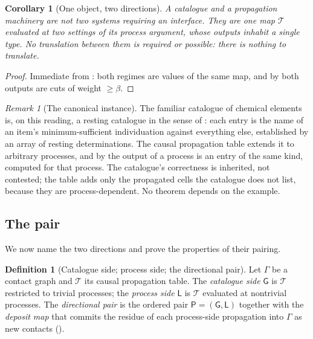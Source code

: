 \documentclass[11pt,twocolumn,a4paper]{article}
\theoremstyle{dirthm}
\newtheorem{corollary}[theorem]{Corollary}
\theoremstyle{definition}
\newtheorem{definition}[theorem]{Definition}
\theoremstyle{remark}
\newtheorem{remark}[theorem]{Remark}
\newcommand{\Gph}{\Gamma}
\newcommand{\flo}{\beta}
\newcommand{\Tab}{\mathcal{T}}
\newcommand{\Model}{\mathsf{L}}
\newcommand{\Graph}{\mathsf{G}}
\newcommand{\Pair}{\mathsf{P}}
\begin{document}
\begin{corollary}[One object, two directions]
\label{cor:one-object}
A catalogue and a propagation machinery are not two systems requiring an
interface. They are one map $\Tab$ evaluated at two settings of its process
argument, whose outputs inhabit a single type. No translation between them is
required or possible: there is nothing to translate.
\end{corollary}

\begin{proof}
Immediate from : both regimes are values of the same
map, and by  both outputs are cuts of weight $\ge\flo$.
\end{proof}

\begin{remark}[The canonical instance]
\label{rem:periodic}
The familiar catalogue of chemical elements
\citep{mendeleev1869,scerri2007} is, on this reading, a resting catalogue in
the sense of : each entry is the name of an item's
minimum-sufficient individuation against everything else, established by an
array of resting determinations. The causal propagation table extends it to
arbitrary processes, and by  the output of a
process is an entry of the same kind, computed for that process. The
catalogue's correctness is inherited, not contested; the table adds only the
propagated cells the catalogue does not list, because they are
process-dependent. No theorem depends on the example.
\end{remark}

\subsection{The pair}

We now name the two directions and prove the properties of their pairing.

\begin{definition}[Catalogue side; process side; the directional pair]
\label{def:pair}
Let $\Gph$ be a contact graph and $\Tab$ its causal propagation table. The
\emph{catalogue side} $\Graph$ is $\Tab$ restricted to trivial processes; the
\emph{process side} $\Model$ is $\Tab$ evaluated at nontrivial processes. The
\emph{directional pair} is the ordered pair $\Pair=(\Graph,\Model)$ together
with the \emph{deposit map} that commits the residue of each process-side
propagation into $\Gph$ as new contacts ().
\end{definition}
\end{document}
